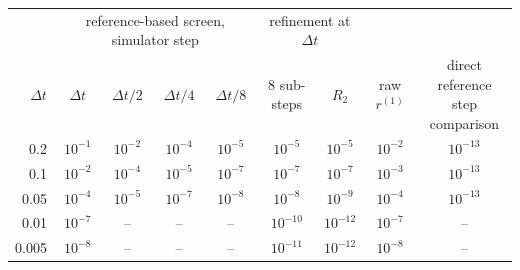\begin{tabular}{rcccccccc}
\toprule
 & \multicolumn{4}{c}{reference-based screen, simulator step} & \multicolumn{2}{c}{refinement at $\Delta t$} & & \\
\cmidrule(lr){2-5}\cmidrule(lr){6-7}
$\Delta t$ & $\Delta t$ & $\Delta t/2$ & $\Delta t/4$ & $\Delta t/8$ & 8 sub-steps & $R_2$ & raw $r^{(1)}$ & \shortstack{direct reference\\step comparison} \\
\midrule
0.2 & $10^{-1}$ & $10^{-2}$ & $10^{-4}$ & $10^{-5}$ & $10^{-5}$ & $10^{-5}$ & $10^{-2}$ & $10^{-13}$ \\
0.1 & $10^{-2}$ & $10^{-4}$ & $10^{-5}$ & $10^{-7}$ & $10^{-7}$ & $10^{-7}$ & $10^{-3}$ & $10^{-13}$ \\
0.05 & $10^{-4}$ & $10^{-5}$ & $10^{-7}$ & $10^{-8}$ & $10^{-8}$ & $10^{-9}$ & $10^{-4}$ & $10^{-13}$ \\
0.01 & $10^{-7}$ & -- & -- & -- & $10^{-10}$ & $10^{-12}$ & $10^{-7}$ & -- \\
0.005 & $10^{-8}$ & -- & -- & -- & $10^{-11}$ & $10^{-12}$ & $10^{-8}$ & -- \\
\bottomrule
\end{tabular}
